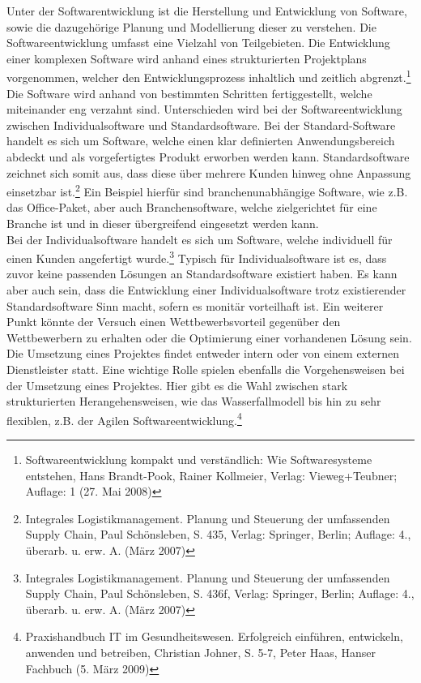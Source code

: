 Unter der Softwarentwicklung ist die Herstellung und Entwicklung von Software, sowie die dazugehörige Planung und Modellierung dieser zu verstehen.
Die Softwareentwicklung umfasst eine Vielzahl von Teilgebieten.
Die Entwicklung einer komplexen Software wird anhand eines strukturierten Projektplans vorgenommen, welcher den Entwicklungsprozess inhaltlich und zeitlich abgrenzt.\footnote{Softwareentwicklung kompakt und verständlich: Wie Softwaresysteme entstehen, Hans Brandt-Pook, Rainer Kollmeier, Verlag: Vieweg+Teubner; Auflage: 1 (27. Mai 2008)}
Die Software wird anhand von bestimmten Schritten fertiggestellt, welche miteinander eng verzahnt sind.
Unterschieden wird bei der Softwareentwicklung zwischen Individualsoftware und Standardsoftware.
Bei der Standard-Software handelt es sich um Software, welche einen klar definierten Anwendungsbereich abdeckt und als vorgefertigtes Produkt erworben werden kann.
Standardsoftware zeichnet sich somit aus, dass diese über mehrere Kunden hinweg ohne Anpassung einsetzbar ist.\footnote{Integrales Logistikmanagement. Planung und Steuerung der umfassenden Supply Chain, Paul Schönsleben, S. 435, Verlag: Springer, Berlin; Auflage: 4., überarb. u. erw. A. (März 2007)}
Ein Beispiel hierfür sind branchenunabhängige Software, wie z.B. das Office-Paket, aber auch Branchensoftware, welche zielgerichtet für eine Branche ist und in dieser übergreifend eingesetzt werden kann.\\
Bei der Individualsoftware handelt es sich um Software, welche individuell für einen Kunden angefertigt wurde.\footnote{Integrales Logistikmanagement. Planung und Steuerung der umfassenden Supply Chain, Paul Schönsleben, S. 436f, Verlag: Springer, Berlin; Auflage: 4., überarb. u. erw. A. (März 2007)}
Typisch für Individualsoftware ist es, dass zuvor keine passenden Lösungen an Standardsoftware existiert haben. 
Es kann aber auch sein, dass die Entwicklung einer Individualsoftware trotz existierender Standardsoftware Sinn macht, sofern es monitär vorteilhaft ist.
Ein weiterer Punkt  könnte der Versuch einen Wettbewerbsvorteil gegenüber den Wettbewerbern zu erhalten oder die Optimierung einer vorhandenen Lösung sein.\\
Die Umsetzung eines Projektes findet entweder intern oder von einem externen Dienstleister statt.
Eine wichtige Rolle spielen ebenfalls die Vorgehensweisen bei der Umsetzung eines Projektes.
Hier gibt es die Wahl zwischen stark strukturierten Herangehensweisen, wie das Wasserfallmodell bis hin zu sehr flexiblen, z.B. der Agilen Softwareentwicklung.\footnote{Praxishandbuch IT im Gesundheitswesen. Erfolgreich einführen, entwickeln, anwenden und betreiben, Christian Johner, S. 5-7, Peter Haas, Hanser Fachbuch (5. März 2009)}\\
